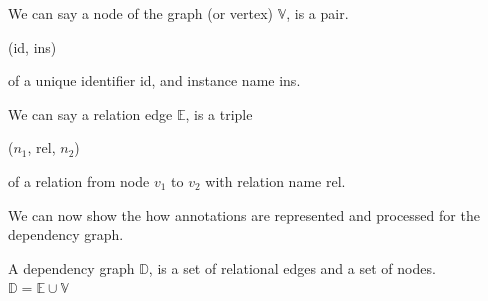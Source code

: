 \begin{defin}[Nodes]
We can say a node of the graph (or vertex) $\mathbb{V}$, is a pair.
\begin{center}
(id, ins)
\end{center}
of a unique identifier id, and instance name ins.
\end{defin}

\begin{defin}
We can say a relation edge $\mathbb{E}$, is a triple
\begin{center}
($n_{1}$, rel, $n_{2}$)
\end{center}
of a relation from node $v_{1}$ to $v_{2}$ with relation name rel.
\end{defin}

We can now show the how annotations are represented and processed for the dependency graph.

\begin{defin}
A dependency graph $\mathbb{D}$, is a set of relational edges and a set of nodes.\\
$\mathbb{D} = \mathbb{E} \cup \mathbb{V}$
\end{defin}


